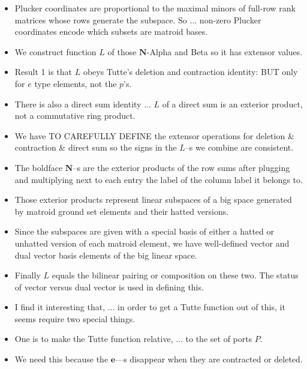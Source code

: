 \documentclass[14pt]{extarticle}
\begin{document}
{\begin{itemize}
      \item
        Plucker coordinates are proportional to the maximal minors of
        full-row rank matrices whose rows generate the subspace.  So ... non-zero Plucker coordinates encode
    which subsets are matroid bases.  

  \item We construct function $L$ of those
    $\mathbf{N}$-Alpha and Beta so it has extensor values.

\item Result 1 is that $L$ obeys Tutte's deletion and contraction identity:  BUT
  only for $e$ type elements, not the $p$'s.  

\item There is also a direct sum identity ... $L$ of a direct sum is an exterior product, not
  a commutative ring product.

\item We have TO CAREFULLY DEFINE the extensor operations for deletion \&
  contraction \& direct sum so the signs in the $L$--s we combine are consistent.

\item
  The boldface $\mathbf{N}$--s are the exterior products of the row sums
  after plugging and multiplying next to each entry the label of the column label it belongs to.
  
\item
  Those exterior products
   represent linear subspaces of a big space generated
  by matroid ground set elements and their hatted versions.  

\item Since the subspaces are given with a special basis of either a hatted or unhatted version
  of each matroid element, we have well-defined vector and dual vector basis elements
  of the big linear space.

\item
  Finally $L$ equals the bilinear pairing or composition on these two.  The status
  of vector versus dual vector is used in defining this.

\item
  I find it interesting that, ... in order to get a Tutte function out
  of this, it seems require two special things.

\item
One is to make the Tutte function relative, ... to the set of ports $P$.

\item
  We need this because the $\mathbf{e}$---s  disappear when they are contracted or deleted.


\end{itemize}}
\end{document}
